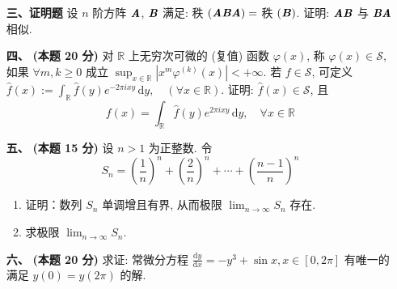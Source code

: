\documentclass[UTF8]{ctexart}
\begin{document}
\begin{enumerate}[labelsep=-0.2em,leftmargin=2em,align=left]
\item[{ \textbf{三、证明题}}]  设 $n$ 阶方阵 $\text{\textbf{\textit{A}}}$, $\text{\textbf{\textit{B}}}$ 满足:  秩 $(\text{\textbf{\textit{ABA}}})=$ 秩 $(\text{\textbf{\textit{B}}})$. 证明:  $\text{\textbf{\textit{AB}}}$ 与 $\text{\textbf{\textit{BA}}}$ 相似.
\item[{ \textbf{四、}}] {\textbf{(本题 20 分)}} 对 $\mathbb{R}$ 上无穷次可微的 (复值) 函数 $\varphi(x)$, 称 $\varphi(x)\in\mathscr{S}$, 如果 $\forall m,k\geqslant0$ 成立 $\sup_{x\in\mathbb{R}}\left|x^m\varphi^{(k)}(x)\right|<+\infty$. 若 $f\in\mathscr{S}$, 可定义 $\hat{f}(x):=\int_{\mathbb{R}}\hat{f}(y)e^{-2\pi ixy}\,\mathrm{d}y,\quad (\forall x\in\mathbb{R}).$ 
	证明: $\hat{f}(x)\in\mathscr{S}$, 且 \[f(x)=\int_{\mathbb{R}}\hat{f}(y)e^{2\pi ixy}\,\mathrm{d}y,\quad \forall x\in\mathbb{R}\]
\item[{\textbf{五、}}] {\textbf{(本题 15 分)}} 设 $n>1$ 为正整数. 令 \[S_n=\left(\frac{1}{n}\right)^n+\left(\frac{2}{n}\right)^n+\cdots+\left(\frac{n-1}{n}\right)^n\]
		\begin{enumerate}[label={\arabic*.},labelsep=-1.7em,leftmargin=1.0em,align=left]
			\item 证明：数列 $S_n$ 单调增且有界, 从而极限 $\lim_{n\to\infty}S_n$ 存在.
			\item 求极限 $\lim_{n\to\infty}S_n$.
		\end{enumerate}
\item[{\textbf{ 六、}}] {\textbf{(本题 20 分)}} 求证: 常微分方程 $\frac{\mathrm{d}y}{\mathrm{d}x}=-y^3+\sin x,x\in[0,2\pi]$  有唯一的满足 $y(0)=y(2\pi)$ 的解.
	\end{enumerate}
	
	
\end{document}
